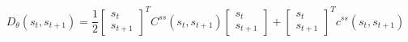 \begin{equation}
\label{formula:output_discriminator}
D_{\theta}(s_{t},s_{t+1}) = \frac{1}{2}
\begin{bmatrix}
s_{t}
\\ 
s_{t+1}
\end{bmatrix}^{T}C^{ss}(s_{t},s_{t+1})
\begin{bmatrix}
s_{t}
\\ 
s_{t+1}
\end{bmatrix} + \begin{bmatrix}
s_{t}
\\ 
s_{t+1}
\end{bmatrix}^{T} c^{ss}(s_{t}, s_{t+1})
\end{equation}